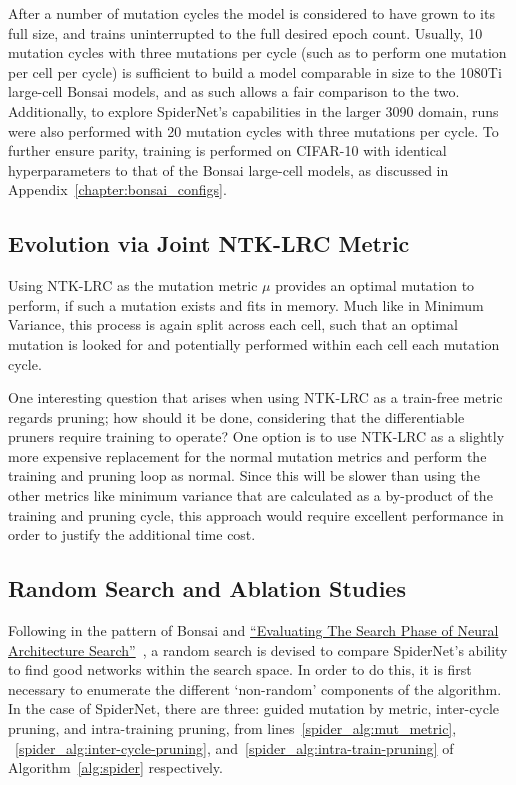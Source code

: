 After a number of mutation cycles the model is considered to have grown to its full size,
and trains uninterrupted to the full desired epoch count. Usually, 10 mutation cycles with three mutations per cycle (such as
to perform one mutation per cell per cycle) is
sufficient to build a model comparable in size to the 1080Ti large-cell Bonsai models,
and as such allows a fair comparison to the two. Additionally, to explore SpiderNet's capabilities in the larger
3090 domain, runs were also performed with 20 mutation cycles with three mutations per cycle. To further ensure
parity, training is performed on CIFAR-10 with identical hyperparameters to that of the Bonsai large-cell models, as discussed in
Appendix~\ref{chapter:bonsai_configs}.

\subsection{Evolution via Joint NTK-LRC Metric}\label{sect:ntklrc-evolution}
Using NTK-LRC as the mutation metric $\mu$ provides an optimal mutation to perform, if such a mutation
exists and fits in memory. Much like in Minimum Variance, this process is again split across each cell, such that
an optimal mutation is looked for and potentially performed within each cell each mutation cycle.

One interesting question that arises when using NTK-LRC as a train-free metric regards pruning;
how should it be done, considering that the differentiable pruners require training to operate? One option is to use NTK-LRC
as a slightly more expensive replacement for the normal mutation metrics and perform the training and pruning loop as
normal. Since this will be slower than using the other metrics like minimum variance that are calculated as a by-product of
the training and pruning cycle, this approach would require excellent performance in order to justify the additional time cost.

\subsection{Random Search and Ablation Studies}\label{sect:spider-random}
Following in the pattern of Bonsai and \hyperlink{cite.yu2019}{``Evaluating The Search Phase of Neural Architecture Search''}~\citep{yu2019},
a random search is devised to compare SpiderNet's ability to find good networks within the search space. In order to do this,
it is first necessary to enumerate the different `non-random' components of the algorithm. In the case of SpiderNet, there are
three: guided mutation by metric, inter-cycle pruning, and intra-training pruning, from lines~\ref{spider_alg:mut_metric},
~\ref{spider_alg:inter-cycle-pruning}, and~\ref{spider_alg:intra-train-pruning} of Algorithm~\ref{alg:spider} respectively.

